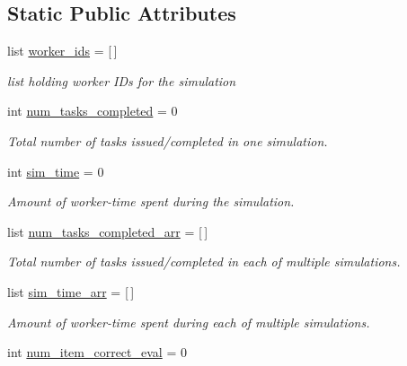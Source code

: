 \subsection*{Static Public Attributes}
\begin{DoxyCompactItemize}
\item 
list \mbox{\hyperlink{classjoinapp_1_1join__simulations_1_1_join_simulation_a231d4f3b3122b16491ad49b8809cab66}{worker\+\_\+ids}} = \mbox{[}$\,$\mbox{]}
\begin{DoxyCompactList}\small\item\em list holding worker I\+Ds for the simulation \end{DoxyCompactList}\item 
int \mbox{\hyperlink{classjoinapp_1_1join__simulations_1_1_join_simulation_acd77c18dffdbc60f1039f2b30f93af7b}{num\+\_\+tasks\+\_\+completed}} = 0
\begin{DoxyCompactList}\small\item\em Total number of tasks issued/completed in one simulation. \end{DoxyCompactList}\item 
int \mbox{\hyperlink{classjoinapp_1_1join__simulations_1_1_join_simulation_aa76f81d59f5db138b1192d3a68745f15}{sim\+\_\+time}} = 0
\begin{DoxyCompactList}\small\item\em Amount of worker-\/time spent during the simulation. \end{DoxyCompactList}\item 
list \mbox{\hyperlink{classjoinapp_1_1join__simulations_1_1_join_simulation_a51b27d8bd028645c3949a9fb5b5e6097}{num\+\_\+tasks\+\_\+completed\+\_\+arr}} = \mbox{[}$\,$\mbox{]}
\begin{DoxyCompactList}\small\item\em Total number of tasks issued/completed in each of multiple simulations. \end{DoxyCompactList}\item 
list \mbox{\hyperlink{classjoinapp_1_1join__simulations_1_1_join_simulation_a4c91ca5341b3e4c31cbef9cb2ed71bc9}{sim\+\_\+time\+\_\+arr}} = \mbox{[}$\,$\mbox{]}
\begin{DoxyCompactList}\small\item\em Amount of worker-\/time spent during each of multiple simulations. \end{DoxyCompactList}\item 
int \mbox{\hyperlink{classjoinapp_1_1join__simulations_1_1_join_simulation_ad8c60509c9ad950a377ff8e1c9f2d112}{num\+\_\+item\+\_\+correct\+\_\+eval}} = 0

\end{DoxyCompactItemize}
